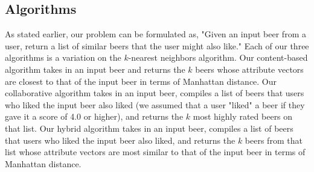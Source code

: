 \documentclass[11pt]{article}
\begin{document}
\subsection*{Algorithms}
As stated earlier, our problem can be formulated as, "Given an input beer from a user, return a list of similar beers that the user might also like." Each of our three algorithms is a variation on the $k$-nearest neighbors algorithm. Our content-based algorithm takes in an input beer and returns the $k$ beers whose attribute vectors are closest to that of the input beer in terms of Manhattan distance. Our collaborative algorithm takes in an input beer, compiles a list of beers that users who liked the input beer also liked (we assumed that a user "liked"  a beer if they gave it a score of 4.0 or higher), and returns the $k$ most highly rated beers on that list. Our hybrid algorithm takes in an input beer, compiles a list of beers that users who liked the input beer also liked, and returns the $k$ beers from that list whose attribute vectors are most similar to that of the input beer in terms of Manhattan distance.
\end{document}
